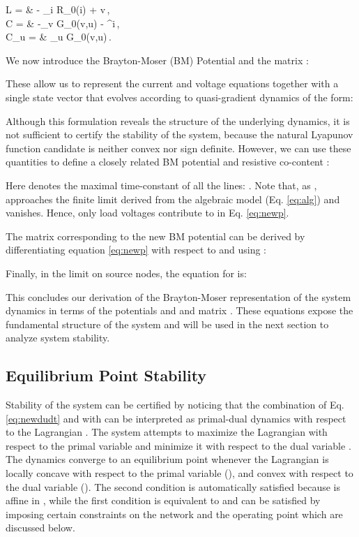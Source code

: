 \documentclass[letterpaper, 10 pt, conference]{ieeeconf}
\begin{document}
     L   = &
     - \partial_i {\cal R}_0(i) + \nabla v\,, \label{didt} \\
      C  = & -\partial_v {\cal G}_0(v,u) - \nabla^\top i\,, \\
      C_u  = &  \partial_u {\cal G}_0(v,u)\,.


We now introduce the Brayton-Moser (BM) Potential  and the matrix  \cite{Brayton:1964gr,Jeltsema:2003jz}:




These allow us to represent the current and voltage equations together with a single state vector  that evolves according to quasi-gradient dynamics of the form:


Although this formulation reveals the structure of the underlying dynamics, it is not sufficient to certify the stability of the system, because the natural Lyapunov function candidate  is neither convex nor sign definite. However, we can use these quantities to define a closely related BM potential  and resistive co-content :

Here  denotes the maximal time-constant of all the lines: . Note that, as ,  approaches the finite limit   derived from the algebraic model (Eq. \eqref{eq:alg}) and  vanishes. Hence, only load voltages contribute to   in Eq. \eqref{eq:newp}.

The matrix  corresponding to the new BM potential  can be derived by differentiating equation \eqref{eq:newp} with respect to  and using :



Finally, in the limit  on source nodes, the equation for  is:


This concludes our derivation of the Brayton-Moser representation of the system dynamics in terms of the potentials  and  and matrix . These equations expose the fundamental structure of the system and will be used in the next section to analyze system stability.

\subsection{Equilibrium Point Stability}

Stability of the system can be certified by noticing that the combination of Eq. \eqref{eq:newdudt} and  with  can be interpreted as primal-dual dynamics with respect to the Lagrangian  \cite{Feijer:2010ia}. The system attempts to maximize the Lagrangian with respect to the primal variable  and minimize it with respect to the dual variable . The dynamics converge to an equilibrium point whenever the Lagrangian is locally concave with respect to the primal variable (), and convex with respect to the dual variable (). The second condition is automatically satisfied because  is affine in , while the first condition is equivalent to  and can be satisfied by imposing certain constraints on the network and the operating point which are discussed below.
\end{document}
